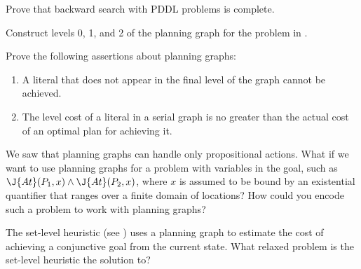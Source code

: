 \begin{exercise}
Prove that backward search with PDDL problems is complete.
\end{exercise} 



\begin{exercise}
Construct levels 0, 1, and 2 of the planning graph for the
problem in .
\end{exercise} 

\begin{exercise}
Prove the following assertions about planning graphs:
\begin{enumerate}
\item A literal that does not appear in the final level of the graph cannot
be achieved.
\item The level cost of a literal in a serial graph is no greater than
the actual cost of an optimal plan for achieving it.
\end{enumerate}
\end{exercise} 

\begin{iexercise}
    We saw that planning graphs can handle only propositional 
    actions.  What if we want to use planning graphs for a problem 
    with variables in the goal, such as \(\J{At}(P_{1}, x) 
    \land \J{At}(P_{2}, x)\), where \(x\) is assumed to be bound by an existential quantifier
    that ranges over a finite domain of 
    locations?  How could you encode such a problem to work with 
    planning graphs?  
\end{iexercise} 

\begin{exercise}
The set-level heuristic (see ) uses a planning
graph to estimate the cost of achieving a conjunctive goal from the
current state.  What relaxed problem is the set-level heuristic the solution to?
\end{exercise} 



